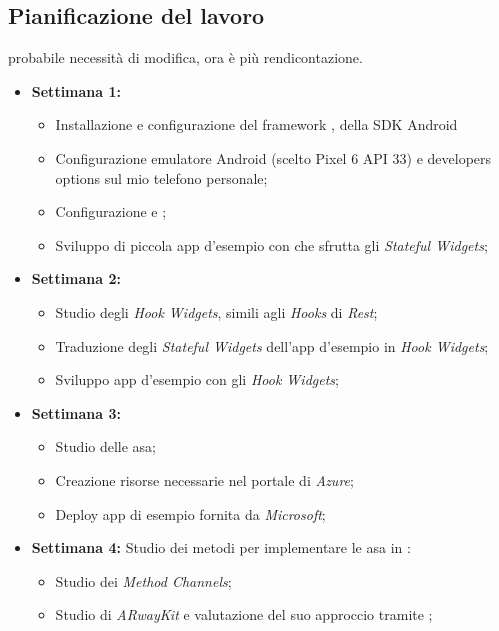 \subsection{Pianificazione del lavoro}
\todo{} \textcolor{todoOrange}{probabile necessità di modifica, ora è più rendicontazione.}
\begin{itemize}
    \item \textbf{Settimana 1:} 
        \begin{itemize}
            \item Installazione e configurazione del framework \flutter, della SDK Android 
            \item Configurazione emulatore Android (scelto Pixel 6 API 33) e 
            developers options sul mio telefono personale;
            \item Configurazione \vsc{} e \astudio;
            \item Sviluppo di piccola app d'esempio con \flutter{} che sfrutta gli \textit{Stateful Widgets};
        \end{itemize} 
    \item \textbf{Settimana 2:} 
        \begin{itemize}
            \item Studio degli \textit{Hook Widgets}, simili agli \textit{Hooks} di \textit{Rest};
            \item Traduzione degli \textit{Stateful Widgets} dell'app d'esempio in \textit{Hook Widgets};
            \item Sviluppo app d'esempio con gli \textit{Hook Widgets};
        \end{itemize}
    \item \textbf{Settimana 3:} 
        \begin{itemize}
            \item Studio delle asa;
            \item Creazione risorse necessarie nel portale di \textit{Azure};
            \item Deploy app di esempio fornita da \textit{Microsoft};
        \end{itemize}
    \item \textbf{Settimana 4:} Studio dei metodi per implementare le asa in \flutter:
        \begin{itemize}
            \item Studio dei \textit{Method Channels};
            \item Studio di \textit{ARwayKit} e valutazione del suo approccio tramite \unity;

\end{itemize}
\end{itemize}
